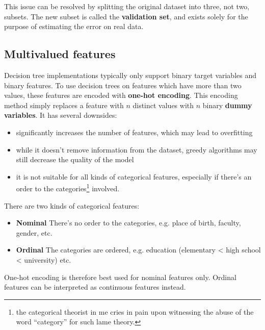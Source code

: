 \documentclass[a4paper]{article}
\begin{document}
	This issue can be resolved by splitting the original dataset into three, not two,
	subsets. The new subset is called the \textbf{validation set}, and exists solely
	for the purpose of estimating the error on real data.

	\subsection{Multivalued features}
	Decision tree implementations typically only support binary target variables and binary features.
	To use decision trees on features which have more than two values, these features are encoded
	with \textbf{one-hot encoding}. This encoding method simply replaces a feature with $n$ distinct
	values with $n$ binary \textbf{dummy variables}. It has several downsides:
	\begin{itemize}
		\item significantly increases the number of features, which may lead to overfitting
		\item while it doesn't remove information from the dataset, greedy algorithms may still
			decrease the quality of the model
		\item it is not suitable for all kinds of categorical features, especially if there's an
			order to the categories\footnote{the categorical theorist in me cries in
			pain upon witnessing the abuse of the word \enquote{category} for such lame theory.}
			involved.
	\end{itemize}
	
	There are two kinds of categorical features:
	\begin{itemize}
		\item \textbf{Nominal} There's no order to the categories, e.g. place of birth, faculty, gender, etc.
		\item \textbf{Ordinal} The categories are ordered, e.g. education
			(elementary < high school < university) etc.
	\end{itemize}

	One-hot encoding is therefore best used for nominal features only. Ordinal features
	can be interpreted as continuous features instead.
\end{document}
